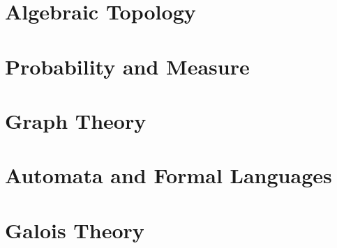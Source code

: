 \newcommand{\yearnumber}{II}


\chapter{Algebraic Topology}

\chapter{Probability and Measure}

\chapter{Graph Theory}

\chapter{Automata and Formal Languages}

\chapter{Galois Theory}



